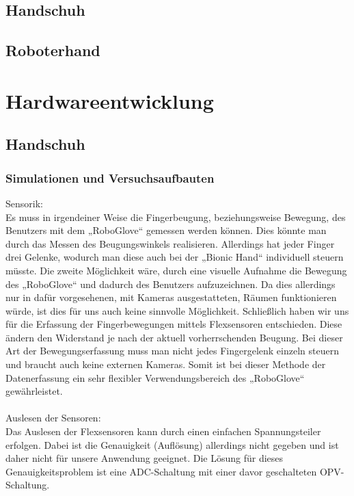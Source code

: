 \documentclass[11pt]{article}
\begin{document}
\subsection{Handschuh}

\subsection{Roboterhand}


\section{Hardwareentwicklung}

\subsection{Handschuh}

\subsubsection{Simulationen und Versuchsaufbauten}
Sensorik:
\\
Es muss in irgendeiner Weise die Fingerbeugung, beziehungsweise Bewegung, des Benutzers mit dem „RoboGlove“ gemessen 
werden können. Dies könnte man durch das Messen des Beugungswinkels realisieren. Allerdings hat jeder Finger drei Gelenke, 
wodurch man diese auch bei der „Bionic Hand“ individuell steuern müsste. Die zweite Möglichkeit wäre, durch eine visuelle 
Aufnahme die Bewegung des „RoboGlove“ und dadurch des Benutzers aufzuzeichnen. Da dies allerdings nur in dafür vorgesehenen, 
mit Kameras ausgestatteten, Räumen funktionieren würde, ist dies für uns auch keine sinnvolle Möglichkeit. Schließlich haben 
wir uns für die Erfassung der Fingerbewegungen mittels Flexsensoren entschieden. Diese ändern den Widerstand je nach der 
aktuell vorherrschenden Beugung. Bei dieser Art der Bewegungserfassung muss man nicht jedes Fingergelenk einzeln steuern und 
braucht auch keine externen Kameras. Somit ist bei dieser Methode der Datenerfassung ein sehr flexibler Verwendungsbereich 
des „RoboGlove“ gewährleistet.\\
\\
Auslesen der Sensoren:
\\
Das Auslesen der Flexsensoren kann durch einen einfachen Spannungsteiler erfolgen. Dabei ist die Genauigkeit (Auflösung) 
allerdings nicht gegeben und ist daher nicht für unsere Anwendung geeignet. Die Lösung für dieses Genauigkeitsproblem ist 
eine ADC-Schaltung mit einer davor geschalteten OPV-Schaltung.
\end{document}

